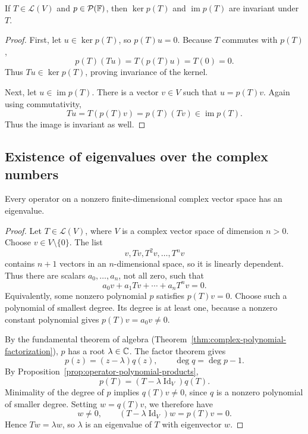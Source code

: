 \begin{proposition}\label{prop:polynomial-kernel-image-invariant}
  If $T\in\mathcal L(V)$ and $p\in\mathcal P(\mathbb{F})$, then
  $\ker p(T)$ and $\operatorname{im}p(T)$ are invariant under $T$.
\end{proposition}

\begin{proof}
  First, let $u\in\ker p(T)$, so $p(T)u=0$. Because $T$ commutes
  with $p(T)$,
  \[
    p(T)(Tu)=T(p(T)u)=T(0)=0.
  \]
  Thus $Tu\in\ker p(T)$, proving invariance of the kernel.

  Next, let $u\in\operatorname{im}p(T)$. There is a vector $v\in V$
  such that $u=p(T)v$. Again using commutativity,
  \[
    Tu=T(p(T)v)=p(T)(Tv)\in\operatorname{im}p(T).
  \]
  Thus the image is invariant as well.
\end{proof}

\subsection{Existence of eigenvalues over the complex numbers}

\begin{theorem}\label{thm:complex-operator-has-eigenvalue}
  Every operator on a nonzero finite-dimensional complex vector
  space has an eigenvalue.
\end{theorem}

\begin{proof}
  Let $T\in\mathcal L(V)$, where $V$ is a complex vector space of
  dimension $n>0$. Choose $v\in V\setminus\{0\}$. The list
  \[
    v,Tv,T^2v,\ldots,T^nv
  \]
  contains $n+1$ vectors in an $n$-dimensional space, so it is
  linearly dependent. Thus there are scalars $a_0,\ldots,a_n$, not
  all zero, such that
  \[
    a_0v+a_1Tv+\cdots+a_nT^nv=0.
  \]
  Equivalently, some nonzero polynomial $p$ satisfies $p(T)v=0$.
  Choose such a polynomial of smallest degree. Its degree is at
  least one, because a nonzero constant polynomial gives
  $p(T)v=a_0v\neq0$.

  By the fundamental theorem of algebra
  (Theorem~\ref{thm:complex-polynomial-factorization}), $p$ has a root
  $\lambda\in\mathbb{C}$. The factor theorem gives
  \[
    p(z)=(z-\lambda)q(z),\qquad \deg q=\deg p-1.
  \]
  By Proposition~\ref{prop:operator-polynomial-products},
  \[
    p(T)=(T-\lambda\operatorname{Id}_V)q(T).
  \]
  Minimality of the degree of $p$ implies $q(T)v\neq0$, since $q$
  is a nonzero polynomial of smaller degree. Setting $w=q(T)v$, we
  therefore have
  \[
    w\neq0,\qquad
    (T-\lambda\operatorname{Id}_V)w=p(T)v=0.
  \]
  Hence $Tw=\lambda w$, so $\lambda$ is an eigenvalue of $T$ with
  eigenvector $w$.
\end{proof}

